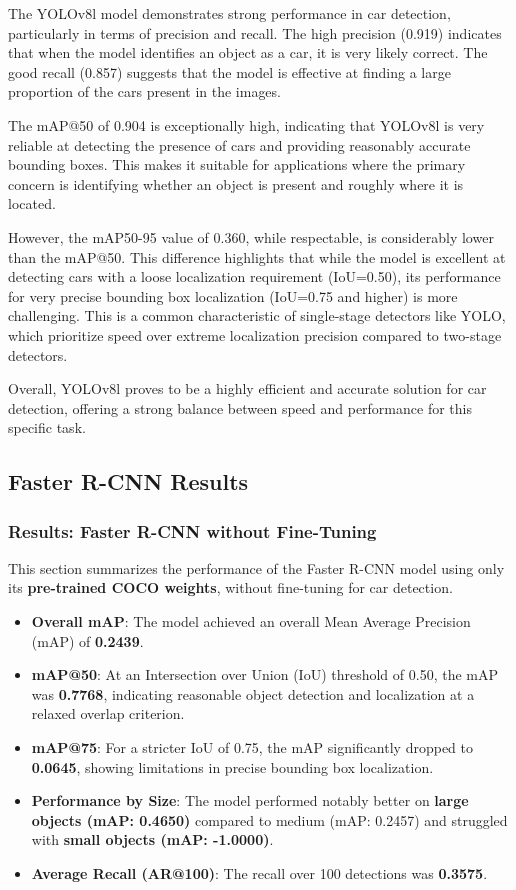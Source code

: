 \documentclass[12pt,a4paper]{article}
\begin{document}
The YOLOv8l model demonstrates strong performance in car detection, particularly in terms of precision and recall. The high precision (0.919) indicates that when the model identifies an object as a car, it is very likely correct. The good recall (0.857) suggests that the model is effective at finding a large proportion of the cars present in the images.

The mAP@50 of 0.904 is exceptionally high, indicating that YOLOv8l is very reliable at detecting the presence of cars and providing reasonably accurate bounding boxes. This makes it suitable for applications where the primary concern is identifying whether an object is present and roughly where it is located.

However, the mAP50-95 value of 0.360, while respectable, is considerably lower than the mAP@50. This difference highlights that while the model is excellent at detecting cars with a loose localization requirement (IoU=0.50), its performance for very precise bounding box localization (IoU=0.75 and higher) is more challenging. This is a common characteristic of single-stage detectors like YOLO, which prioritize speed over extreme localization precision compared to two-stage detectors.

Overall, YOLOv8l proves to be a highly efficient and accurate solution for car detection, offering a strong balance between speed and performance for this specific task.

\subsection{Faster R-CNN Results}
\subsubsection{Results: Faster R-CNN without Fine-Tuning}
\label{ssec:results_fasterrcnn_pretrained}

This section summarizes the performance of the Faster R-CNN model using only its \textbf{pre-trained COCO weights}, without fine-tuning for car detection.

\begin{itemize}
    \item \textbf{Overall mAP}: The model achieved an overall Mean Average Precision (mAP) of \textbf{0.2439}.
    \item \textbf{mAP@50}: At an Intersection over Union (IoU) threshold of 0.50, the mAP was \textbf{0.7768}, indicating reasonable object detection and localization at a relaxed overlap criterion.
    \item \textbf{mAP@75}: For a stricter IoU of 0.75, the mAP significantly dropped to \textbf{0.0645}, showing limitations in precise bounding box localization.
    \item \textbf{Performance by Size}: The model performed notably better on \textbf{large objects (mAP: 0.4650)} compared to medium (mAP: 0.2457) and struggled with \textbf{small objects (mAP: -1.0000)}.
    \item \textbf{Average Recall (AR@100)}: The recall over 100 detections was \textbf{0.3575}.
\end{itemize}
\end{document}
